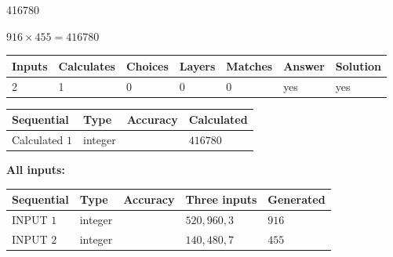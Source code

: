 \documentclass{ctexart}
\begin{document}
 
 
\noindent{}
 
 

416780
 
 
\noindent{}
 
 

 
 
 
\noindent{}
 
 

$ %
916 \times  %
455=   %
416780$
 
 
\noindent{}
 
 

 
   
   
   
   
\noindent\begin{tabular}{|l|l|l|l|l|l|l|}
 \hline
Inputs & Calculates & Choices & Layers & Matches & Answer & Solution \\ \hline
 2  & 
 1  & 
 0
  & 
 0  & 
 0  & 
  yes & 
  yes 
  \\ \hline
 \end{tabular}
   
   
   
   
\noindent{}
   
   
  
  
\noindent\begin{tabular}{|l|l|l|l|}
\hline
 Sequential & Type & Accuracy & Calculated \\ 
\hline
 
 
  Calculated $  1 $ & integer &  & 
  $ 416780 $ 
 \\  \hline  
 \end{tabular}
   
   
   
   
\noindent\vspace{0.1in}\hspace{-0.08in} {\textbf{\Large{All inputs: }}}
   
   
  
  
\noindent\begin{tabular}{|l|l|l|l|l|}
\hline
 Sequential & Type & Accuracy & Three inputs & Generated \\ 
\hline
 
 
  INPUT $  1 $ & integer &  & $
 520
 , 
 960
 , 
 3
 $ & $ 916 $ 
 \\  \hline  
 
 
  INPUT $  2 $ & integer &  & $
 140
 , 
 480
 , 
 7
 $ & $ 455 $ 
 \\  \hline  
 \end{tabular}
   
\end{document}
